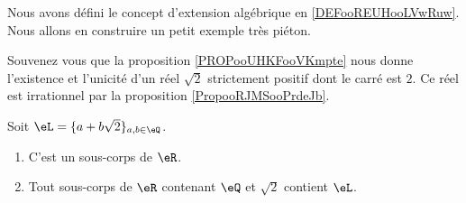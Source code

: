 \begin{normaltext}
	Nous avons défini le concept d'extension algébrique en \ref{DEFooREUHooLVwRuw}. Nous allons en construire un petit exemple très piéton.

	Souvenez vous que la proposition \ref{PROPooUHKFooVKmpte} nous donne l'existence et l'unicité d'un réel \( \sqrt{ 2 }\) strictement positif dont le carré est \( 2\). Ce réel est irrationnel par la proposition \ref{PropooRJMSooPrdeJb}.
\end{normaltext}

\begin{proposition}
	Soit \( \eL=\{ a+b\sqrt{ 2 } \}_{a,b\in \eQ}\).
	\begin{enumerate}
		\item
		      C'est un sous-corps de \( \eR\).
		\item   \label{ITEMooUSOAooZoBhla}
		      Tout sous-corps de \( \eR\) contenant \( \eQ\) et \( \sqrt{ 2 }\) contient \( \eL\).
	\end{enumerate}
\end{proposition}


